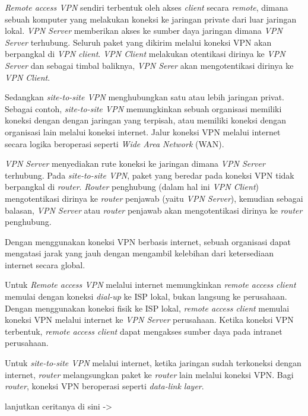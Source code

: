\documentclass[pdftex,12pt, oneside]{article}
\begin{document}
\begin{enumerate}
\begin{enumerate}
  \textit{Remote access VPN} sendiri terbentuk oleh akses \textit{client} secara \textit{remote}, dimana sebuah komputer yang melakukan koneksi ke jaringan private dari luar jaringan lokal. \textit{VPN Server} memberikan akses ke sumber daya jaringan dimana \textit{VPN Server} terhubung. Seluruh paket yang dikirim melalui koneksi VPN akan berpangkal di \textit{VPN client}. \textit{VPN Client} melakukan otentikasi dirinya ke \textit{VPN Server} dan sebagai timbal baliknya, \textit{VPN Serer} akan mengotentikasi dirinya ke \textit{VPN Client}.
  
  Sedangkan \textit{site-to-site VPN} menghubungkan satu atau lebih jaringan privat. Sebagai contoh, \textit{site-to-site VPN} memungkinkan sebuah organisasi memiliki koneksi dengan dengan jaringan yang terpisah, atau memiliki koneksi dengan organisasi lain melalui koneksi internet. Jalur koneksi VPN melalui internet secara logika beroperasi seperti \textit{Wide Area Network} (WAN).
  
  \textit{VPN Server} menyediakan rute koneksi ke jaringan dimana \textit{VPN Server} terhubung. Pada \textit{site-to-site VPN}, paket yang beredar pada koneksi VPN tidak berpangkal di \textit{router}. \textit{Router} penghubung (dalam hal ini \textit{VPN Client}) mengotentikasi dirinya ke \textit{router} penjawab (yaitu \textit{VPN Server}), kemudian sebagai balasan, \textit{VPN Server} atau \textit{router} penjawab akan mengotentikasi dirinya ke \textit{router} penghubung.
  
  Dengan menggunakan koneksi VPN berbasis internet, sebuah organisasi dapat mengatasi jarak yang jauh dengan mengambil kelebihan dari ketersediaan internet secara global.
  
  Untuk \textit{Remote access VPN} melalui internet memungkinkan \textit{remote access client} memulai dengan koneksi \textit{dial-up} ke ISP lokal, bukan langsung ke perusahaan. Dengan menggunakan koneksi fisik ke ISP lokal, \textit{remote access client} memulai koneksi VPN melalui internet ke \textit{VPN Server} perusahaan. Ketika koneksi VPN terbentuk, \textit{remote access client} dapat mengakses sumber daya pada intranet perusahaan.
  
  Untuk \textit{site-to-site VPN} melalui internet, ketika jaringan sudah terkoneksi dengan internet, \textit{router} melangsungkan paket ke \textit{router} lain melalui koneksi VPN. Bagi \textit{router}, koneksi VPN beroperasi seperti \textit{data-link layer}.
  
  lanjutkan ceritanya di sini -> 
  

\end{enumerate}
\end{enumerate}
\end{document}
